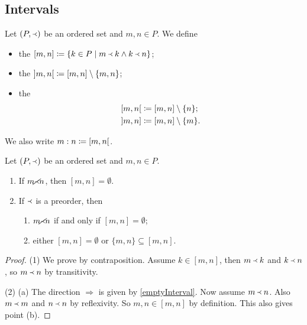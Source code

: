 \subsection{Intervals}
\begin{definition}
Let $(P,\Yleft)$ be an ordered set and $m,n\in P$. We define
\begin{itemize}
\item the  $\interval[c]{m,n} \defeq \setbuilder{k\in P}{m\Yleft k \land k\Yleft n}$;
\item the  $\interval[o]{m,n} \defeq [m,n]\setminus\{m,n\}$;
\item the 
\begin{align*}
\interval[co]{m,n} &\defeq \interval{m,n}\setminus\{n\}; \\
\interval[oc]{m,n} &\defeq \interval{m,n}\setminus\{m\}.
\end{align*}
\end{itemize}
We also write $m:n \defeq \interval[co]{m,n}$.
\end{definition}

\begin{lemma} \label{emptyInterval}
Let $(P,\Yleft)$ be an ordered set and $m,n\in P$.
\begin{enumerate}
\item If $m \cancel\Yleft n$, then $[m,n] = \emptyset$.
\item If $\Yleft$ is a preorder, then
\begin{enumerate}
\item $m \cancel\Yleft n$ \textup{if and only if} $[m,n] = \emptyset$;
\item either $[m,n] = \emptyset$ or $\{m,n\} \subseteq [m,n]$.
\end{enumerate}
\end{enumerate}
\end{lemma}
\begin{proof}
(1) We prove by contraposition. Assume $k\in [m,n]$, then $m\Yleft k$ and $k\Yleft n$, so $m\Yleft n$ by transitivity.

(2) (a) The direction $\Rightarrow$ is given by \ref{emptyInterval}. Now assume $m \Yleft n$. Also $m\Yleft m$ and $n \Yleft n$ by reflexivity. So $m,n\in [m,n]$ by definition. This also gives point (b).
\end{proof}



